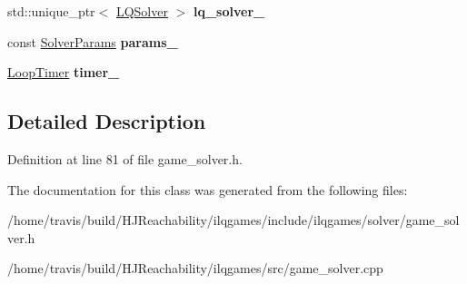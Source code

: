 \begin{DoxyCompactItemize}
\item 
std\+::unique\+\_\+ptr$<$ \hyperlink{classilqgames_1_1_l_q_solver}{L\+Q\+Solver} $>$ {\bfseries lq\+\_\+solver\+\_\+}\hypertarget{classilqgames_1_1_game_solver_a1b7e0da6a2566c0a959b7c6c9d7845be}{}\label{classilqgames_1_1_game_solver_a1b7e0da6a2566c0a959b7c6c9d7845be}

\item 
const \hyperlink{structilqgames_1_1_solver_params}{Solver\+Params} {\bfseries params\+\_\+}\hypertarget{classilqgames_1_1_game_solver_adb70fc48a6420c1b516becd5c108a92a}{}\label{classilqgames_1_1_game_solver_adb70fc48a6420c1b516becd5c108a92a}

\item 
\hyperlink{classilqgames_1_1_loop_timer}{Loop\+Timer} {\bfseries timer\+\_\+}\hypertarget{classilqgames_1_1_game_solver_ae77a0725fdd98ec49f96ebf33d966650}{}\label{classilqgames_1_1_game_solver_ae77a0725fdd98ec49f96ebf33d966650}

\end{DoxyCompactItemize}


\subsection{Detailed Description}


Definition at line 81 of file game\+\_\+solver.\+h.



The documentation for this class was generated from the following files\+:\begin{DoxyCompactItemize}
\item 
/home/travis/build/\+H\+J\+Reachability/ilqgames/include/ilqgames/solver/game\+\_\+solver.\+h\item 
/home/travis/build/\+H\+J\+Reachability/ilqgames/src/game\+\_\+solver.\+cpp\end{DoxyCompactItemize}
